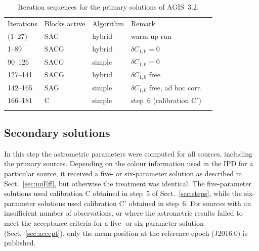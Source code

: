 \documentclass[longauth]{aa} %
\begin{document}
\begin{table}
\caption{Iteration sequences for the primary solutions of AGIS~3.2.  
\label{tab:iterations}}
\small
\begin{tabular}{lllll}
\hline\hline
\noalign{\smallskip}
Iterations & Blocks active & Algorithm & Remark\\ %
\noalign{\smallskip}
\hline
\noalign{\smallskip}
(1--27) & SAC & hybrid & warm up run\\ %
1--89 & SACG & hybrid & $\delta C_{1,0}=0$ \\ %
90--126 & SACG & simple & $\delta C_{1,0}=0$ \\ %
127--141 & SACG & hybrid & $\delta C_{1,0}$ free \\ %
142--165 & SAG & simple & $\delta C_{1,0}$ free, ad hoc corr. \\ %
166--181 & C & simple & step~6 (calibration C$'$) \\ 
\noalign{\smallskip}
\hline
\end{tabular}
\end{table}



\subsection{Secondary solutions}
\label{sec:sec}

In this step the astrometric parameters were computed for all sources, including the primary sources.
Depending on the colour information used in the IPD for a particular source, it received a 
five- or six-parameter solution as described in Sect.~\ref{sec:nuEff}, but otherwise the treatment
was identical. The five-parameter solutions used calibration C obtained in step~5 of 
Sect.~\ref{sec:steps}, while the six-parameter solutions used calibration C$'$ obtained in step~6. 
For sources with an insufficient number of observations, or where the astrometric results failed to meet
the acceptance criteria for a five- or six-parameter solution (Sect.~\ref{sec:accept}), only 
the mean position at the reference epoch (J2016.0) is published. 
\end{document}
